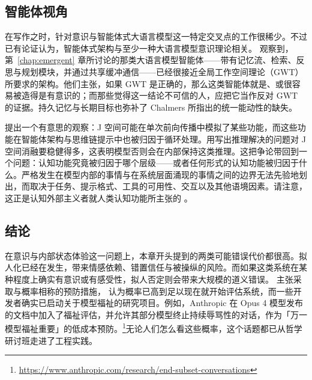 \subsection{智能体视角}
在写作之时，针对意识与智能体式大语言模型这一特定交叉点的工作很稀少。不过已有论证认为，智能体式架构与至少一种大语言模型意识理论相关。\citet{goldstein2024doeschatgptmind} 观察到，第~\ref{chap:emergent} 章所讨论的那类大语言模型智能体——带有记忆流、检索、反思与规划模块，并通过共享缓冲通信——已经很接近全局工作空间理论（GWT）所要求的架构。他们主张，如果 GWT 是正确的，那么这类智能体就是、或很容易被造得是有意识的；而那些觉得这一结论不可信的人，应把它当作反对 GWT 的证据。持久记忆与长期目标也弥补了 Chalmers 所指出的统一能动性的缺失。

\citet{gurnee2026verbalize} 提出一个有意思的观察：J 空间可能在单次前向传播中模拟了某些功能，而这些功能在智能体架构与思维链提示中也被归因于循环处理。用写出推理解决的问题对 J 空间消融要稳健得多，这表明模型否则会在内部保持这类推理。这把争论带回到一个问题：认知功能究竟被归因于哪个层级——或者任何形式的认知功能被归因于什么。严格发生在模型内部的事情与在系统层面涌现的事情之间的边界无法先验地划出，而取决于任务、提示格式、工具的可用性、交互以及其他语境因素。请注意，这正是认知外部主义者就人类认知功能所主张的 \citep{noe2009outofourheads}。

\subsection{结论}
在意识与内部状态体验这一问题上，本章开头提到的两类可能错误代价都很高。拟人化已经在发生，带来情感依赖、错置信任与被操纵的风险。而如果这类系统在某种程度上确实有意识或有感受性，拟人否定则会带来大规模的道义错误。\citet{birch2024gaming} 主张采取与概率相称的预防措施，\citet{butlin2023consciousness} 认为概率已高到足以现在就开始评估系统，而一些开发者确实已启动关于模型福祉的研究项目。例如，Anthropic 在 Opus 4 模型发布的文档中加入了福祉评估，并允许其部分模型终止持续辱骂性的对话，作为「万一模型福祉重要」的低成本预防。\footnote{\url{https://www.anthropic.com/research/end-subset-conversations}}无论人们怎么看这些概率，这个话题都已从哲学研讨班走进了工程实践。

